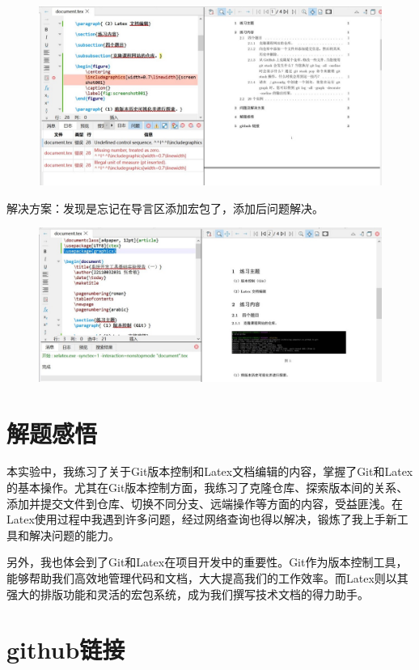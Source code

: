 \documentclass[a4paper, 12pt]{article}
\begin{document}
	\begin{figure}[H]
		\centering
		\includegraphics[width=1\textwidth]{100.jpg}
	\end{figure}
	
	解决方案：发现是忘记在导言区添加宏包了，添加后问题解决。
	
	\begin{figure}[H]
		\centering
		\includegraphics[width=1\textwidth]{101.jpg}
	\end{figure}
	
	\section{解题感悟}
	
	本实验中，我练习了关于Git版本控制和Latex文档编辑的内容，掌握了Git和Latex的基本操作。尤其在Git版本控制方面，我练习了克隆仓库、探索版本间的关系、添加并提交文件到仓库、切换不同分支、远端操作等方面的内容，受益匪浅。在Latex使用过程中我遇到许多问题，经过网络查询也得以解决，锻炼了我上手新工具和解决问题的能力。
	
	另外，我也体会到了Git和Latex在项目开发中的重要性。Git作为版本控制工具，能够帮助我们高效地管理代码和文档，大大提高我们的工作效率。而Latex则以其强大的排版功能和灵活的宏包系统，成为我们撰写技术文档的得力助手。
	
	\section{github链接}
	\underline{}	
	
\end{document}

